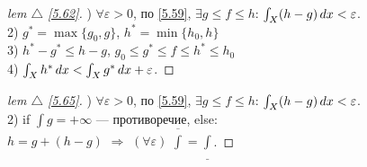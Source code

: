 \begin{minipage}[]{0.49\textwidth}
\begin{proof}[
lem $\triangle$
\eqref{5.62}]

\phantom{42}

) $\forall \varepsilon > 0$, по \eqref{5.59}, $\exists g \leq f \leq h$: 
$\int_X(h-g)\, d x < \varepsilon$. \\ 
2) $g^* = \max\{g_0, g\}$, $h^* = \min\{h_0, h\}$ \\ 
3) $h^* - g^* \leq h - g$, $g_0 \leq g^* \leq f \leq h^* \leq h_0$\\ 
4) $\int_X h^* \, d x < \int_X g^* \, d x + \varepsilon$.
\end{proof}
\end{minipage}
\hfill
\begin{minipage}[]{0.49\textwidth}
\begin{proof}[
 lem $\triangle$
\eqref{5.65}]

\phantom{42}

) $\forall \varepsilon > 0$, по \eqref{5.59}, $\exists g \leq f \leq h$: 
$\int_X(h-g)\, d x < \varepsilon$. \\ 
2) if $\int g = + \infty$ — противоречие, else: \\ 
$h = g + (h-g)$ $\Rightarrow$ $(\forall \varepsilon)$ $\overline{\int} = \underline{\int}$.

\end{proof}
\end{minipage}

